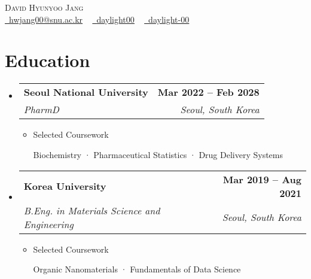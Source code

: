 \documentclass[letterpaper,11pt]{article}
\makeatletter
\newcommand{\resumeItem}[1]{
  \item\small{
    {#1 \vspace{-2pt}}
  }
}
\newcommand{\resumeSubheading}[4]{
  \vspace{-2pt}\item
    \begin{tabular*}{1.0\textwidth}[t]{l@{\extracolsep{\fill}}r}
      \textbf{#1} & \textbf{\small #2} \\
      \textit{\small#3} & \textit{\small #4} \\
    \end{tabular*}\vspace{-7pt}
}
\newcommand{\resumeSubHeadingListStart}{\begin{itemize}[leftmargin=0.0in, label={}]}
\newcommand{\resumeSubHeadingListEnd}{\end{itemize}}
\newcommand{\resumeItemListStart}{\begin{itemize}}
\newcommand{\resumeItemListEnd}{\end{itemize}\vspace{-5pt}}
\makeatother
\begin{document}

\begin{center}
    {\Huge \scshape David Hyunyoo Jang} \\ \vspace{1pt}
    \small 
    \href{mailto:hwjang00@snu.ac.kr}{\raisebox{-0.2\height}\faEnvelope\  \underline{hwjang00@snu.ac.kr}} ~ 
    \href{https://linkedin.com/in/daylight00/}{\raisebox{-0.2\height}\faLinkedin\ \underline{daylight00}}  ~
    \href{https://github.com/daylight-00}{\raisebox{-0.2\height}\faGithub\ \underline{daylight-00}}
    \vspace{-8pt}
\end{center}


\section{Education}
  \resumeSubHeadingListStart
    \resumeSubheading
      {Seoul National University}{Mar 2022 -- Feb 2028}
      {PharmD}{Seoul, South Korea}
      \resumeItemListStart
        \resumeItem{Selected Coursework} 
          {Biochemistry · Pharmaceutical Statistics · Drug Delivery Systems}
      \resumeItemListEnd
    \resumeSubheading
      {Korea University}{Mar 2019 -- Aug 2021}
      {B.Eng. in Materials Science and Engineering}{Seoul, South Korea}
      \resumeItemListStart
        \resumeItem{Selected Coursework}
          {Organic Nanomaterials · Fundamentals of Data Science}
      \resumeItemListEnd
  \resumeSubHeadingListEnd
\end{document}
